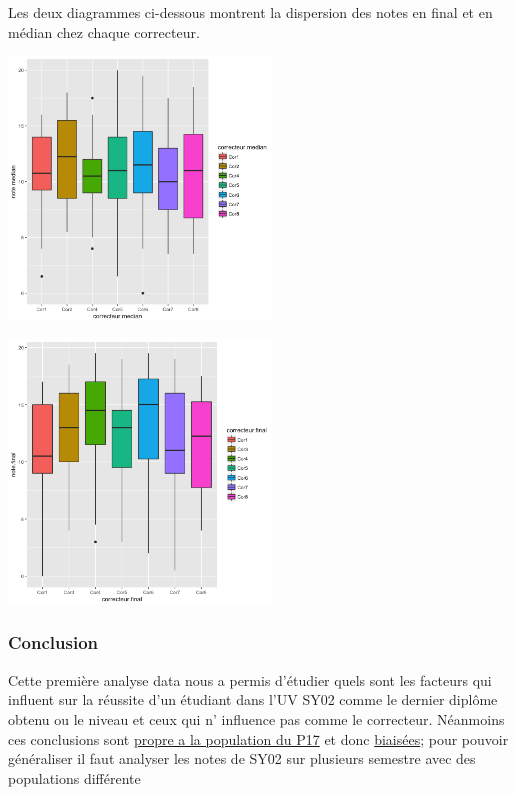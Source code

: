 \documentclass[]{report}
\begin{document}
\begin{minipage}{\linewidth}
	Les deux diagrammes ci-dessous montrent la dispersion des notes en final et en médian chez chaque correcteur.\\
	\begin{minipage}{0.50\linewidth}
	\includegraphics[width=70mm]{Figures/Notes/correcteur_median.png}
	\label{fig:scatter_correcteur_median}
	\end{minipage}
	\hspace{0.08\linewidth}
	\begin{minipage}{0.40\linewidth}	
		\includegraphics[width=70mm]{Figures/Notes/correcteur_final.png}
		\label{fig:scatter_correcteur_median}
	\end{minipage}
\end{minipage}

\subsubsection{Conclusion}
Cette première analyse data nous a permis d'étudier  quels sont les facteurs qui influent sur la réussite d'un étudiant dans l'UV SY02 comme le dernier diplôme obtenu ou le niveau et ceux qui n' influence pas comme le correcteur. Néanmoins ces conclusions sont \underline{propre a la population du P17} et donc  \underline{biaisées}; pour pouvoir généraliser il faut analyser les notes de SY02 sur plusieurs semestre avec des populations différente 
\end{document}
